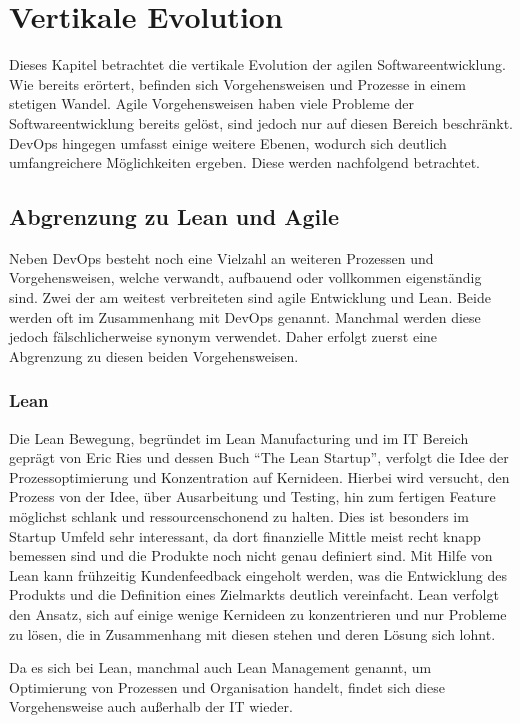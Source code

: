 \chapter{Vertikale Evolution} %
Dieses Kapitel betrachtet die vertikale Evolution der agilen Softwareentwicklung. Wie bereits erörtert, befinden sich Vorgehensweisen und Prozesse in einem stetigen Wandel. Agile Vorgehensweisen haben viele Probleme der Softwareentwicklung bereits gelöst, sind jedoch nur auf diesen Bereich beschränkt. DevOps hingegen umfasst einige weitere Ebenen, wodurch sich deutlich umfangreichere Möglichkeiten ergeben. Diese werden nachfolgend betrachtet.

\section{Abgrenzung zu Lean und Agile} %
Neben DevOps besteht noch eine Vielzahl an weiteren Prozessen und Vorgehensweisen, welche verwandt, aufbauend oder vollkommen eigenständig sind. Zwei der am weitest verbreiteten sind agile Entwicklung und Lean. Beide werden oft im Zusammenhang mit DevOps genannt. Manchmal werden diese jedoch fälschlicherweise synonym verwendet. Daher erfolgt zuerst eine Abgrenzung zu diesen beiden Vorgehensweisen.

\subsection{Lean}
Die Lean Bewegung, begründet im Lean Manufacturing und im IT Bereich geprägt von Eric Ries und dessen Buch \enquote{The Lean Startup}, verfolgt die Idee der Prozessoptimierung und Konzentration auf Kernideen. 
Hierbei wird versucht, den Prozess von der Idee, über Ausarbeitung und Testing, hin zum fertigen Feature möglichst schlank und ressourcenschonend zu halten. 
Dies ist besonders im Startup Umfeld sehr interessant, da dort finanzielle Mittle meist recht knapp bemessen sind und die Produkte noch nicht genau definiert sind. 
Mit Hilfe von Lean kann frühzeitig Kundenfeedback eingeholt werden, was die Entwicklung des Produkts und die Definition eines Zielmarkts deutlich vereinfacht.
Lean verfolgt den Ansatz, sich auf einige wenige Kernideen zu konzentrieren und nur Probleme zu lösen, die in Zusammenhang mit diesen stehen und deren Lösung sich lohnt. \parencite[Vgl.][S. 15 - 24]{ries:2011}

Da es sich bei Lean, manchmal auch Lean Management genannt, um Optimierung von Prozessen und Organisation handelt, findet sich diese Vorgehensweise auch außerhalb der IT wieder.

